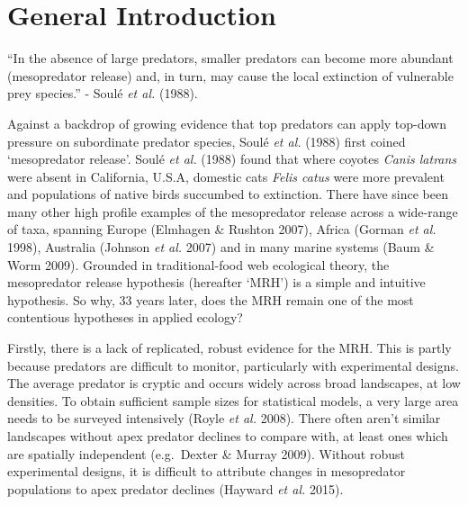 \documentclass[11pt,a4paper,titlepage,twoside,openright]{style/unimelbthesis}
\begin{document}
\begin{mainmatter}

\hypertarget{general-introduction}{%
\chapter{General Introduction}\label{general-introduction}}

``In the absence of large predators, smaller predators can become more abundant (mesopredator release) and, in turn, may cause the local extinction of vulnerable prey species.'' - Soulé \emph{et al.} (1988).

Against a backdrop of growing evidence that top predators can apply top-down pressure on subordinate predator species, Soulé \emph{et al.} (1988) first coined `mesopredator release'. Soulé \emph{et al.} (1988) found that where coyotes \emph{Canis latrans} were absent in California, U.S.A, domestic cats \emph{Felis catus} were more prevalent and populations of native birds succumbed to extinction. There have since been many other high profile examples of the mesopredator release across a wide-range of taxa, spanning Europe (Elmhagen \& Rushton 2007), Africa (Gorman \emph{et al.} 1998), Australia (Johnson \emph{et al.} 2007) and in many marine systems (Baum \& Worm 2009). Grounded in traditional-food web ecological theory, the mesopredator release hypothesis (hereafter `MRH') is a simple and intuitive hypothesis. So why, 33 years later, does the MRH remain one of the most contentious hypotheses in applied ecology?

Firstly, there is a lack of replicated, robust evidence for the MRH. This is partly because predators are difficult to monitor, particularly with experimental designs. The average predator is cryptic and occurs widely across broad landscapes, at low densities. To obtain sufficient sample sizes for statistical models, a very large area needs to be surveyed intensively (Royle \emph{et al.} 2008). There often aren't similar landscapes without apex predator declines to compare with, at least ones which are spatially independent (e.g.~Dexter \& Murray 2009). Without robust experimental designs, it is difficult to attribute changes in mesopredator populations to apex predator declines (Hayward \emph{et al.} 2015).


\end{mainmatter}
\end{document}
